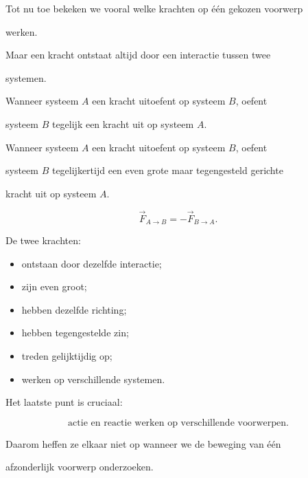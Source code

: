\documentclass{ximera}
\begin{document}




Tot nu toe bekeken we vooral welke krachten op één gekozen voorwerp

werken.

Maar een kracht ontstaat altijd door een interactie tussen twee

systemen.

Wanneer systeem $A$ een kracht uitoefent op systeem $B$, oefent

systeem $B$ tegelijk een kracht uit op systeem $A$.


\begin{definitie}

Wanneer systeem $A$ een kracht uitoefent op systeem $B$, oefent

systeem $B$ tegelijkertijd een even grote maar tegengesteld gerichte

kracht uit op systeem $A$.

\[\boxed{ \vec F_{A\rightarrow B} = -\vec F_{B\rightarrow A}. }\]

\end{definitie}


De twee krachten:

\begin{itemize}

 \item ontstaan door dezelfde interactie;

 \item zijn even groot;

 \item hebben dezelfde richting;

 \item hebben tegengestelde zin;

 \item treden gelijktijdig op;

 \item werken op verschillende systemen.

\end{itemize}


\begin{opmerking}

Het laatste punt is cruciaal:

\[\boxed{ \text{actie en reactie werken op verschillende voorwerpen.} }\]

Daarom heffen ze elkaar niet op wanneer we de beweging van één

afzonderlijk voorwerp onderzoeken.

\end{opmerking}
\end{document}
